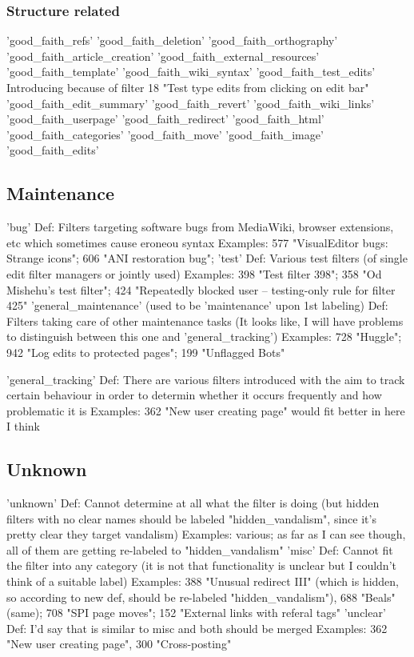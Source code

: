 \subsubsection{Structure related}
'good\_faith\_refs'
'good\_faith\_deletion'
'good\_faith\_orthography'
'good\_faith\_article\_creation'
'good\_faith\_external\_resources'
'good\_faith\_template'
'good\_faith\_wiki\_syntax'
'good\_faith\_test\_edits'
Introducing because of filter 18 "Test type edits from clicking on edit bar"
'good\_faith\_edit\_summary'
'good\_faith\_revert'
'good\_faith\_wiki\_links'
'good\_faith\_userpage'
'good\_faith\_redirect'
'good\_faith\_html'
'good\_faith\_categories'
'good\_faith\_move'
'good\_faith\_image'
'good\_faith\_edits'


\subsection{Maintenance}

'bug'
  Def: Filters targeting software bugs from MediaWiki, browser extensions, etc which sometimes cause eroneou syntax
  Examples: 577 "VisualEditor bugs: Strange icons"; 606 "ANI restoration bug";
'test'
  Def: Various test filters (of single edit filter managers or jointly used)
  Examples: 398 "Test filter 398"; 358 "Od Mishehu's test filter"; 424 "Repeatedly blocked user --  testing-only rule for filter 425"
'general\_maintenance' (used to be 'maintenance' upon 1st labeling)
  Def: Filters taking care of other maintenance tasks (It looks like, I will have problems to distinguish between this one and 'general\_tracking')
  Examples: 728 "Huggle"; 942 "Log edits to protected pages"; 199 "Unflagged Bots"

'general\_tracking'
  Def: There are various filters introduced with the aim to track certain behaviour in order to determin whether it occurs frequently and how problematic it is
  Examples: 362 "New user creating page" would fit better in here I think


\subsection{Unknown}

'unknown'
  Def: Cannot determine at all what the filter is doing (but hidden filters with no clear names should be labeled "hidden\_vandalism", since it's pretty clear they target vandalism)
  Examples: various; as far as I can see though, all of them are getting re-labeled to "hidden\_vandalism"
'misc'
  Def: Cannot fit the filter into any category (it is not that functionality is unclear but I couldn't think of a suitable label)
  Examples: 388 "Unusual redirect III" (which is hidden, so according to new def, should be re-labeled "hidden\_vandalism"), 688 "Beals" (same); 708 "SPI page moves"; 152 "External links with referal tags"
'unclear'
  Def: I'd say that is similar to misc and both should be merged
  Examples: 362 "New user creating page", 300 "Cross-posting"


